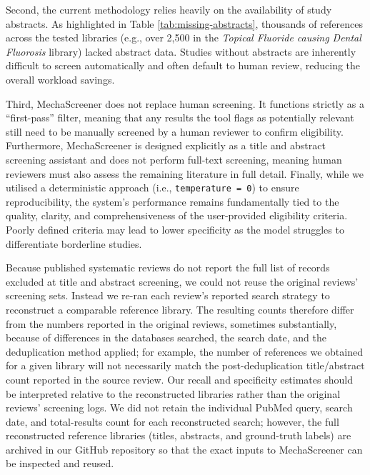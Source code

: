 \documentclass[11pt,a4paper]{article}
\begin{document}
Second, the current methodology relies heavily on the availability of study abstracts. As highlighted in Table \ref{tab:missing-abstracts}, thousands of references across the tested libraries (e.g., over 2,500 in the \textit{Topical Fluoride causing Dental Fluorosis} library) lacked abstract data. Studies without abstracts are inherently difficult to screen automatically and often default to human review, reducing the overall workload savings.

Third, MechaScreener does not replace human screening. It functions strictly as a ``first-pass'' filter, meaning that any results the tool flags as potentially relevant still need to be manually screened by a human reviewer to confirm eligibility. Furthermore, MechaScreener is designed explicitly as a title and abstract screening assistant and does not perform full-text screening, meaning human reviewers must also assess the remaining literature in full detail. Finally, while we utilised a deterministic approach (i.e., \texttt{temperature = 0}) to ensure reproducibility, the system's performance remains fundamentally tied to the quality, clarity, and comprehensiveness of the user-provided eligibility criteria. Poorly defined criteria may lead to lower specificity as the model struggles to differentiate borderline studies.

Because published systematic reviews do not report the full list of records excluded at title and abstract screening, we could not reuse the original reviews' screening sets. Instead we re-ran each review's reported search strategy to reconstruct a comparable reference library. The resulting counts therefore differ from the numbers reported in the original reviews, sometimes substantially, because of differences in the databases searched, the search date, and the deduplication method applied; for example, the number of references we obtained for a given library will not necessarily match the post-deduplication title/abstract count reported in the source review. Our recall and specificity estimates should be interpreted relative to the reconstructed libraries rather than the original reviews' screening logs. We did not retain the individual PubMed query, search date, and total-results count for each reconstructed search; however, the full reconstructed reference libraries (titles, abstracts, and ground-truth labels) are archived in our GitHub repository so that the exact inputs to MechaScreener can be inspected and reused.
\end{document}
